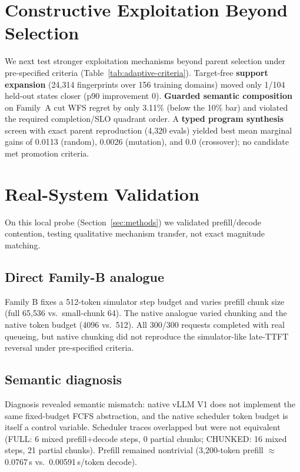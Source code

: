 \documentclass[runningheads]{llncs}
\begin{document}
\section{Constructive Exploitation Beyond Selection}
\label{sec:constructive}

We next test stronger exploitation mechanisms beyond parent selection under
pre-specified criteria (Table~\ref{tab:adaptive-criteria}). Target-free
\textbf{support expansion} (24{,}314 fingerprints over 156 training domains)
moved only 1/104 held-out states closer (p90 improvement 0).
\textbf{Guarded semantic composition} on Family~A cut WFS regret by only
3.11\% (below the 10\% bar) and violated the required completion/SLO
quadrant order. A \textbf{typed program synthesis} screen with exact parent
reproduction (4{,}320 evals) yielded best mean marginal gains of 0.0113
(random), 0.0026 (mutation), and 0.0 (crossover); no candidate met promotion
criteria.

\section{Real-System Validation}
\label{sec:real}

On this local probe (Section~\ref{sec:methods}) we validated prefill/decode
contention, testing qualitative mechanism transfer, not exact magnitude
matching.

\subsection{Direct Family-B analogue}

Family B fixes a 512-token simulator step budget and varies prefill chunk size
(full 65{,}536 vs.\ small-chunk 64). The native analogue varied chunking and
the native token budget (4096 vs.\ 512). All 300/300 requests completed
with real queueing, but native chunking did not reproduce the simulator-like
late-TTFT reversal under pre-specified criteria.

\subsection{Semantic diagnosis}

Diagnosis revealed semantic mismatch: native vLLM V1 does not implement the
same fixed-budget FCFS abstraction, and the native scheduler token budget is
itself a control variable. Scheduler traces overlapped but were not equivalent
(FULL: 6 mixed prefill+decode steps, 0 partial chunks; CHUNKED: 16 mixed steps,
21 partial chunks). Prefill remained nontrivial (3{,}200-token prefill
$\approx$0.0767\,s vs.\ 0.00591\,s/token decode).
\end{document}
